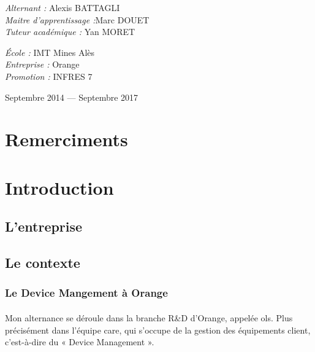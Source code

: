 \documentclass[12pt,a4paper]{report}
\begin{document}
\begin{titlepage}
\begin{center}
    \begin{minipage}{0.5\textwidth}
      \begin{flushleft} \large
        \emph{Alternant :} Alexis \textsc{BATTAGLI}\\
        \emph{Maitre d'apprentissage :}Marc \textsc{DOUET}\\
        \emph{Tuteur académique : } Yan \textsc{MORET}
      \end{flushleft}
    \end{minipage}
    \begin{minipage}{0.4\textwidth}
      \begin{flushright} \large
      	\emph{École :} IMT Mines Alès\\
       	\emph{Entreprise :} Orange\\
        \emph{Promotion :} INFRES 7\\
      \end{flushright}
    \end{minipage}

    \vfill

    {\large Septembre 2014 — Septembre 2017}

  \end{center}
\end{titlepage}
\newpage

\section*{Remerciments}
\newpage
\tableofcontents
\printnoidxglossaries
\listoffigures
\newpage

\section{Introduction}
\subsection{L'entreprise}

\subsection{Le contexte}
\subsubsection{Le Device Mangement à Orange}
\paragraph*{}
Mon alternance se déroule dans la branche R\&D d’Orange, appelée \gls{ols}. Plus précisément dans l’équipe \gls{care}, qui s’occupe de la gestion des équipements client, c’est-à-dire du « Device Management ».
\end{document}
